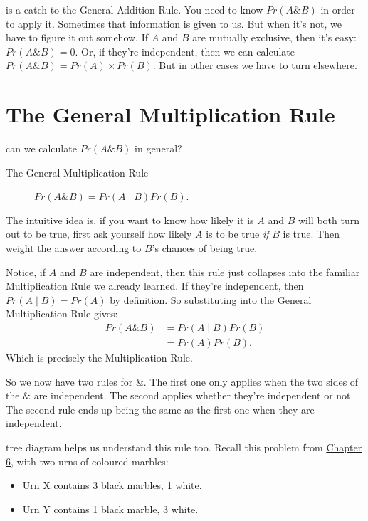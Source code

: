 \documentclass[justified]{tufte-book}
\providecommand{\tightlist}{%
  \setlength{\itemsep}{0pt}\setlength{\parskip}{0pt}}
\newcommand{\given}{\mid}
\renewcommand{\wedge}{\mathbin{\&}}
\newcommand{\p}{Pr}
\theoremstyle{definition}
\theoremstyle{definition}
\theoremstyle{definition}
\theoremstyle{remark}
\begin{document}
 is a catch to the General Addition Rule. You need to
know \(\p(A \wedge B)\) in order to apply it. Sometimes that information
is given to us. But when it's not, we have to figure it out somehow. If
\(A\) and \(B\) are mutually exclusive, then it's easy:
\(\p(A \wedge B) = 0\). Or, if they're independent, then we can
calculate \(\p(A \wedge B) = \p(A) \times \p(B)\). But in other cases we
have to turn elsewhere.

\hypertarget{the-general-multiplication-rule}{%
\section{The General Multiplication
Rule}\label{the-general-multiplication-rule}}

 can we calculate \(\p(A \wedge B)\) in general?

\begin{description}
\item[The General Multiplication Rule]
\(\p(A \wedge B) = \p(A \given B) \p(B).\)
\end{description}

The intuitive idea is, if you want to know how likely it is \(A\) and
\(B\) will both turn out to be true, first ask yourself how likely \(A\)
is to be true \emph{if} \(B\) is true. Then weight the answer according
to \(B\)'s chances of being true.

Notice, if \(A\) and \(B\) are independent, then this rule just
collapses into the familiar Multiplication Rule we already learned. If
they're independent, then \(\p(A \given B) = \p(A)\) by definition. So
substituting into the General Multiplication Rule gives: \[
  \begin{aligned}
    \p(A \wedge B) &= \p(A \given B) \p(B)\\
                   &= \p(A) \p(B).
  \end{aligned}
\] Which is precisely the Multiplication Rule.

So we now have two rules for \(\wedge\). The first one only applies when
the two sides of the \(\wedge\) are independent. The second applies
whether they're independent or not. The second rule ends up being the
same as the first one when they are independent.

 tree diagram helps us understand this rule too. Recall
this problem from \protect\hyperlink{conditional-probability}{Chapter
6}, with two urns of coloured marbles:

\begin{itemize}
\tightlist
\item
  Urn X contains 3 black marbles, 1 white.
\item
  Urn Y contains 1 black marble, 3 white.
\end{itemize}
\end{document}
